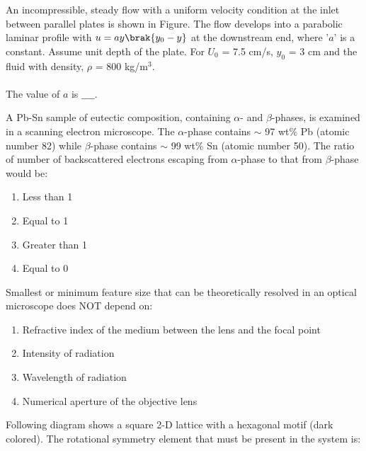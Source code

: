 \item An incompressible, steady flow with a uniform velocity condition at the inlet between parallel plates is shown in Figure. The flow develops into a parabolic laminar profile with $u = ay\brak{y_0 - y}$ at the downstream end, where '$a$' is a constant. Assume unit depth of the plate. For $U_0$ = 7.5 cm/s, $y_0$ = 3 cm and the fluid with density, $\rho$ = 800 kg/$\text{m}^3$. \\\\
The value of $a$ is $\_\_\_\_$. \\
\begin{figure}[!ht]
\centering
\resizebox{0.7\textwidth}{!}{%

}%
\end{figure}
\item A Pb-Sn sample of eutectic composition, containing $\alpha$- and $\beta$-phases, is examined in a scanning electron microscope. The $\alpha$-phase contains $\sim$ 97 wt\% Pb (atomic number 82) while $\beta$-phase contains $\sim$ 99 wt\% Sn (atomic number 50). The ratio of number of backscattered electrons escaping from $\alpha$-phase to that from $\beta$-phase would be:
\begin{enumerate}
    \item Less than 1
    \item Equal to 1
    \item Greater than 1
    \item Equal to 0 \\
\end{enumerate}
\item Smallest or minimum feature size that can be theoretically resolved in an optical microscope does NOT depend on:
\begin{enumerate}
    \item Refractive index of the medium between the lens and the focal point
    \item Intensity of radiation
    \item Wavelength of radiation
    \item Numerical aperture of the objective lens \\ 
\end{enumerate}
\item Following diagram shows a square 2-D lattice with a hexagonal motif (dark colored). The rotational symmetry element that must be present in the system is:
\begin{figure}[!ht]
\centering
\resizebox{0.3\textwidth}{!}{%

}%
\end{figure}
